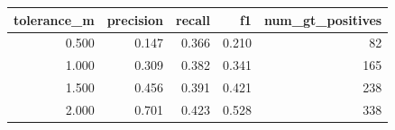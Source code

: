 \begin{tabular}{rrrrr}
\toprule
tolerance\_m & precision & recall & f1 & num\_gt\_positives \\
\midrule
0.500 & 0.147 & 0.366 & 0.210 & 82 \\
1.000 & 0.309 & 0.382 & 0.341 & 165 \\
1.500 & 0.456 & 0.391 & 0.421 & 238 \\
2.000 & 0.701 & 0.423 & 0.528 & 338 \\
\bottomrule
\end{tabular}
